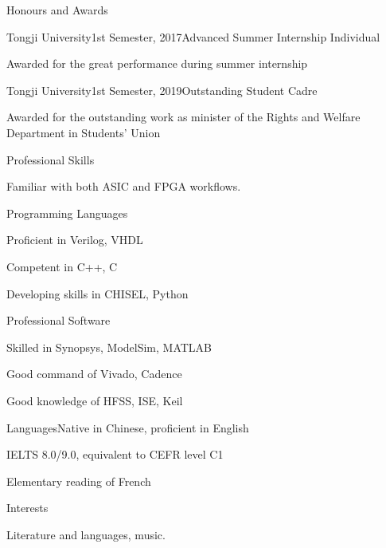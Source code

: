 \documentclass{resume} %
\begin{document}
\begin{rSection}{Honours and Awards}
	
	\begin{rSubsection}{Tongji University}{1st Semester, 2017}{Advanced Summer Internship Individual}{}
		\item Awarded for the great performance during summer internship
	\end{rSubsection}
		
	\begin{rSubsection}{Tongji University}{1st Semester, 2019}{Outstanding Student Cadre}{}
		\item Awarded for the outstanding work as minister of the Rights and Welfare Department in Students' Union
	\end{rSubsection}

\end{rSection}

\begin{rSection}{Professional Skills}

	Familiar with both ASIC and FPGA workflows. 
	
	\begin{rSubsection}{Programming Languages}{}{}{}
		\item Proficient in Verilog, VHDL
		\item Competent in C++, C
		\item Developing skills in CHISEL, Python
	\end{rSubsection}

	\begin{rSubsection}{Professional Software}{}{}{}
		\item Skilled in Synopsys, ModelSim, MATLAB 
		\item Good command of Vivado, Cadence
		\item Good knowledge of HFSS, ISE, Keil
	\end{rSubsection}

	\begin{rSubsection}{Languages}{}{Native in Chinese, proficient in English}{}
		\item IELTS 8.0/9.0, equivalent to CEFR level C1
		\item Elementary reading of French
	\end{rSubsection}

\end{rSection}

\begin{rSection}{Interests}
	\item Literature and languages, music. 
\end{rSection}
\end{document}
